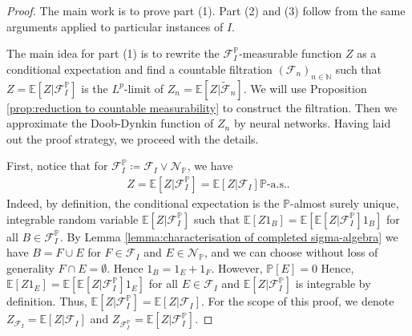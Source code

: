 \documentclass[11pt,a4paper,twoside,openany]{report}
\numberwithin{equation}{section}
\theoremstyle{plain} %
\theoremstyle{definition} %
\theoremstyle{remark} %
\begin{document}
\begin{proof}   
The main work is to prove part (1). Part (2) and (3) follow from the same arguments applied to particular instances of \(I\). 


The main idea for part (1) is to rewrite the \(\mathcal{F}_I^{\mathbb{P}}\)-measurable function \(Z\) as a conditional expectation and find a countable filtration \((\mathcal{F}_n)_{n\in\mathbb{N}}\) such that \(Z=\mathbb{E}[Z|\mathcal{F}_I^{\mathbb{P}}]\) is the \(L^p\)-limit of \(Z_n=\mathbb{E}[Z|\widetilde{\mathcal{F}}_n]\). We will use Proposition \ref{prop:reduction to countable measurability} to construct the filtration. Then we approximate the Doob-Dynkin function of \(Z_n\) by neural networks. Having laid out the proof strategy, we proceed with the details.


First, notice that for \(\mathcal{F}_I^{\mathbb{P}}\coloneqq\mathcal{F}_I\vee\mathcal{N}_{\mathbb{P}}\), we have
\begin{align*}
    Z=\mathbb{E}[Z|\mathcal{F}_I^{\mathbb{P}}]=\mathbb{E}[Z|\mathcal{F}_I]\mathbb{P}\text{-a.s.}. 
\end{align*}
Indeed, by definition, the conditional expectation is the \(\mathbb{P}\)-almost surely unique, integrable random variable \(\mathbb{E}[Z|\mathcal{F}_I^{\mathbb{P}}]\) such that \(\mathbb{E}[Z1_B]=\mathbb{E}[\mathbb{E}[Z|\mathcal{F}_I^{\mathbb{P}}]1_B]\) for all \(B\in\mathcal{F}_I^{\mathbb{P}}\). By Lemma \ref{lemma:characterisation of completed sigma-algebra} we have \(B=F\cup E\) for \(F\in\mathcal{F}_I\) and \(E\in\mathcal{N}_{\mathbb{P}}\), and we can choose without loss of generality \(F\cap E=\emptyset\). Hence \(1_{B}=1_E+1_F\). However, \(\mathbb{P}[E]=0\) Hence, \(\mathbb{E}[Z1_E]=\mathbb{E}[\mathbb{E}[Z|\mathcal{F}_I^{\mathbb{P}}]1_E]\) for all \(E\in\mathcal{F}_I\) and \(\mathbb{E}[Z|\mathcal{F}_I^{\mathbb{P}}]\) is integrable by definition. Thus, \(\mathbb{E}[Z|\mathcal{F}_I^{\mathbb{P}}]=\mathbb{E}[Z|\mathcal{F}_I]\). For the scope of this proof, we denote \(Z_{\mathcal{F}_I}=\mathbb{E}[Z|\mathcal{F}_I]\) and \(Z_{\mathcal{F}_I^{\mathbb{P}}}=\mathbb{E}[Z|\mathcal{F}_I^{\mathbb{P}}]\).



\end{proof}
\end{document}
